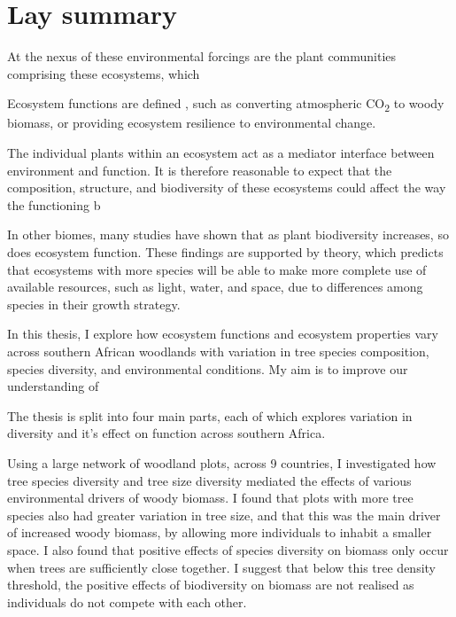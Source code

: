 \chapter*{Lay summary}
\label{lay}


At the nexus of these environmental forcings are the plant communities comprising these ecosystems, which 

Ecosystem functions are defined , such as converting atmospheric CO\textsubscript{2} to woody biomass, or providing ecosystem resilience to environmental change. 

The individual plants within an ecosystem act as a mediator interface between environment and function. It is therefore reasonable to expect that the composition, structure, and biodiversity of these ecosystems could affect the way the functioning b

In other biomes, many studies have shown that as plant biodiversity increases, so does ecosystem function. These findings are supported by theory, which predicts that ecosystems with more species will be able to make more complete use of available resources, such as light, water, and space, due to differences among species in their growth strategy. 

In this thesis, I explore how ecosystem functions and ecosystem properties vary across southern African woodlands with variation in tree species composition, species diversity, and environmental conditions. My aim is to improve our understanding of 

The thesis is split into four main parts, each of which explores variation in diversity and it's effect on function across southern Africa.

Using a large network of woodland plots, across 9 countries, I investigated how tree species diversity and tree size diversity mediated the effects of various environmental drivers of woody biomass. I found that plots with more tree species also had greater variation in tree size, and that this was the main driver of increased woody biomass, by allowing more individuals to inhabit a smaller space. I also found that positive effects of species diversity on biomass only occur when trees are sufficiently close together. I suggest that below this tree density threshold, the positive effects of biodiversity on biomass are not realised as individuals do not compete with each other.

